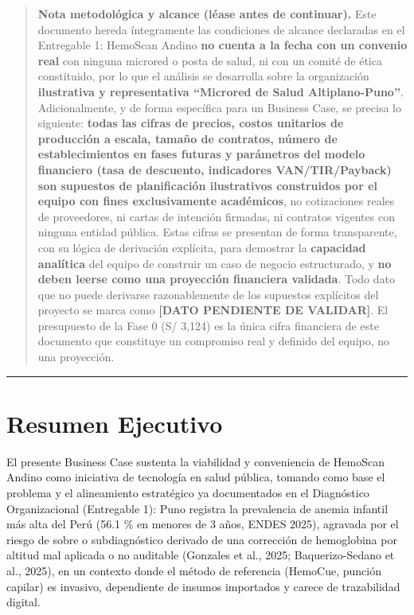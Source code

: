 \documentclass[11pt,a4paper]{article}
\begin{document}
\begin{quote}
\textbf{Nota metodológica y alcance (léase antes de continuar).} Este documento hereda íntegramente las condiciones de alcance declaradas en el Entregable 1: HemoScan Andino \textbf{no cuenta a la fecha con un convenio real} con ninguna microred o posta de salud, ni con un comité de ética constituido, por lo que el análisis se desarrolla sobre la organización \textbf{ilustrativa y representativa ``Microred de Salud Altiplano-Puno''}. Adicionalmente, y de forma específica para un Business Case, se precisa lo siguiente: \textbf{todas las cifras de precios, costos unitarios de producción a escala, tamaño de contratos, número de establecimientos en fases futuras y parámetros del modelo financiero (tasa de descuento, indicadores VAN/TIR/Payback) son supuestos de planificación ilustrativos construidos por el equipo con fines exclusivamente académicos}, no cotizaciones reales de proveedores, ni cartas de intención firmadas, ni contratos vigentes con ninguna entidad pública. Estas cifras se presentan de forma transparente, con su lógica de derivación explícita, para demostrar la \textbf{capacidad analítica} del equipo de construir un caso de negocio estructurado, y \textbf{no deben leerse como una proyección financiera validada}. Todo dato que no puede derivarse razonablemente de los supuestos explícitos del proyecto se marca como \textbf{{[}DATO PENDIENTE DE VALIDAR{]}}. El presupuesto de la Fase 0 (S/ 3,124) es la única cifra financiera de este documento que constituye un compromiso real y definido del equipo, no una proyección.
\end{quote}

\begin{center}\rule{0.5\linewidth}{0.5pt}\end{center}

\section{Resumen Ejecutivo}\label{resumen-ejecutivo}

El presente Business Case sustenta la viabilidad y conveniencia de HemoScan Andino como iniciativa de tecnología en salud pública, tomando como base el problema y el alineamiento estratégico ya documentados en el Diagnóstico Organizacional (Entregable 1): Puno registra la prevalencia de anemia infantil más alta del Perú (56.1 \% en menores de 3 años, ENDES 2025), agravada por el riesgo de sobre o subdiagnóstico derivado de una corrección de hemoglobina por altitud mal aplicada o no auditable (Gonzales et al., 2025; Baquerizo-Sedano et al., 2025), en un contexto donde el método de referencia (HemoCue, punción capilar) es invasivo, dependiente de insumos importados y carece de trazabilidad digital.
\end{document}
